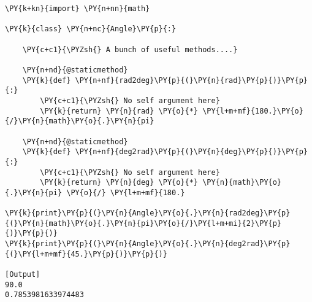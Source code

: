 \begin{Verbatim}[label=\makebox{\url{https://github.com/lucabaldini/cmepda/tree/master/slides/latex/snippets/staticmethod.py}},commandchars=\\\{\}]
\PY{k+kn}{import} \PY{n+nn}{math} 

\PY{k}{class} \PY{n+nc}{Angle}\PY{p}{:}
    
    \PY{c+c1}{\PYZsh{} A bunch of useful methods....}
    
    \PY{n+nd}{@staticmethod}
    \PY{k}{def} \PY{n+nf}{rad2deg}\PY{p}{(}\PY{n}{rad}\PY{p}{)}\PY{p}{:}
        \PY{c+c1}{\PYZsh{} No self argument here}
        \PY{k}{return} \PY{n}{rad} \PY{o}{*} \PY{l+m+mf}{180.}\PY{o}{/}\PY{n}{math}\PY{o}{.}\PY{n}{pi}
    
    \PY{n+nd}{@staticmethod}
    \PY{k}{def} \PY{n+nf}{deg2rad}\PY{p}{(}\PY{n}{deg}\PY{p}{)}\PY{p}{:}
        \PY{c+c1}{\PYZsh{} No self argument here}
        \PY{k}{return} \PY{n}{deg} \PY{o}{*} \PY{n}{math}\PY{o}{.}\PY{n}{pi} \PY{o}{/} \PY{l+m+mf}{180.}
        
\PY{k}{print}\PY{p}{(}\PY{n}{Angle}\PY{o}{.}\PY{n}{rad2deg}\PY{p}{(}\PY{n}{math}\PY{o}{.}\PY{n}{pi}\PY{o}{/}\PY{l+m+mi}{2}\PY{p}{)}\PY{p}{)}
\PY{k}{print}\PY{p}{(}\PY{n}{Angle}\PY{o}{.}\PY{n}{deg2rad}\PY{p}{(}\PY{l+m+mf}{45.}\PY{p}{)}\PY{p}{)}

[Output]
90.0
0.7853981633974483
\end{Verbatim}